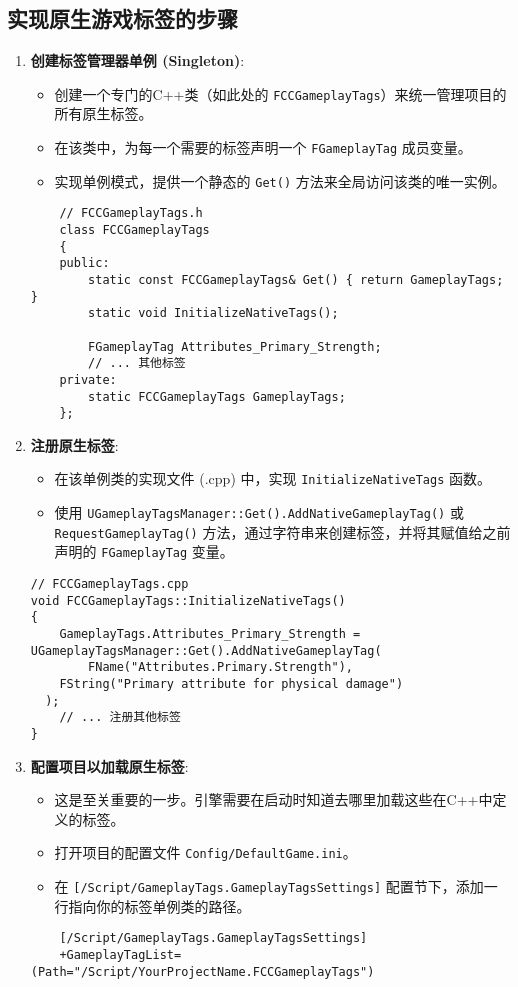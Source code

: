 \documentclass[math,code,10pt,CJKmath]{amznotes}
\begin{document}
\subsection{实现原生游戏标签的步骤}
\begin{enumerate}
    \item \textbf{创建标签管理器单例 (Singleton)}:
    \begin{itemize}
        \item 创建一个专门的C++类（如此处的 \texttt{FCCGameplayTags}）来统一管理项目的所有原生标签。
        \item 在该类中，为每一个需要的标签声明一个 \texttt{FGameplayTag} 成员变量。
        \item 实现单例模式，提供一个静态的 \texttt{Get()} 方法来全局访问该类的唯一实例。
    \end{itemize}
    \begin{verbatim}
    // FCCGameplayTags.h
    class FCCGameplayTags
    {
    public:
        static const FCCGameplayTags& Get() { return GameplayTags; }
        static void InitializeNativeTags();

        FGameplayTag Attributes_Primary_Strength;
        // ... 其他标签
    private:
        static FCCGameplayTags GameplayTags;
    };
    \end{verbatim}

    \item \textbf{注册原生标签}:
    \begin{itemize}
        \item 在该单例类的实现文件 (.cpp) 中，实现 \texttt{InitializeNativeTags} 函数。
        \item 使用 \texttt{UGameplayTagsManager::Get().AddNativeGameplayTag()} 或 \texttt{RequestGameplayTag()} 方法，通过字符串来创建标签，并将其赋值给之前声明的 \texttt{FGameplayTag} 变量。
    \end{itemize}
\begin{verbatim}
// FCCGameplayTags.cpp
void FCCGameplayTags::InitializeNativeTags()
{
	GameplayTags.Attributes_Primary_Strength = UGameplayTagsManager::Get().AddNativeGameplayTag(
		FName("Attributes.Primary.Strength"),
  	FString("Primary attribute for physical damage")
  );
	// ... 注册其他标签
}
    \end{verbatim}

    \item \textbf{配置项目以加载原生标签}:
    \begin{itemize}
        \item 这是至关重要的一步。引擎需要在启动时知道去哪里加载这些在C++中定义的标签。
        \item 打开项目的配置文件 \texttt{Config/DefaultGame.ini}。
        \item 在 \texttt{[/Script/GameplayTags.GameplayTagsSettings]} 配置节下，添加一行指向你的标签单例类的路径。
    \end{itemize}
    \begin{verbatim}
    [/Script/GameplayTags.GameplayTagsSettings]
    +GameplayTagList=(Path="/Script/YourProjectName.FCCGameplayTags")
    \end{verbatim}
    

\end{enumerate}
\end{document}
